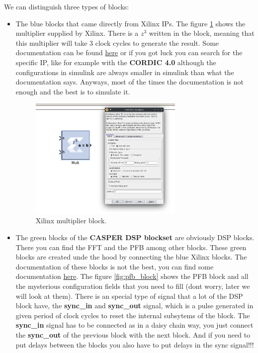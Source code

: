 We can distinguish three types of blocks:
\begin{itemize}
    \item The blue blocks that came directly from Xilinx IPs. The figure \ref{fig:mult} shows the multiplier supplied by Xilinx. There is a $z^3$ written in the block, meaning that this multiplier will take 3 clock cycles to generate the result. Some documentation can be found \href{https://docs.amd.com/v/u/en-US/sysgen_ref}{here} or if you got luck you can search for the specific IP, like for example with the \textbf{CORDIC 4.0} although the configurations in simulink are always smaller in simulink than what the documentation says. Anyways, most of the times the documentation is not enough and the best is to simulate it.
    \begin{figure}[h]
        \centering
        \includegraphics[width=0.7\textwidth]{images/multiplier-ex.png}
        \caption{Xilinx multiplier block.}
        \label{fig:mult}
    \end{figure}

    \item The green blocks of the \textbf{CASPER DSP blockset} are obviously DSP blocks. There you can find the FFT and the PFB among other blocks. These green blocks are created unde the hood by connecting the blue Xilinx blocks. The documentation of these blocks is not the best, you can find some documentation \href{https://casper-toolflow.readthedocs.io/en/latest/blockdocumentation.html}{here}. The figure \ref{fig:pfb_block} shows the PFB block and all the mysterious configuration fields that you need to fill (dont worry, later we will look at them). 
    There is an special type of signal that a lot of the DSP block have, the \textbf{sync\_in} and \textbf{sync\_out} signal, which is a pulse generated in given period of clock cycles to reset the internal subsytems of the block. The \textbf{sync\_in} signal has to be connected as in a daisy chain way, you just connect the \textbf{sync\_out} of the previous block with the next block. And if you need to put delays between the blocks you also have to put delays in the sync signal!!!


\end{itemize}
